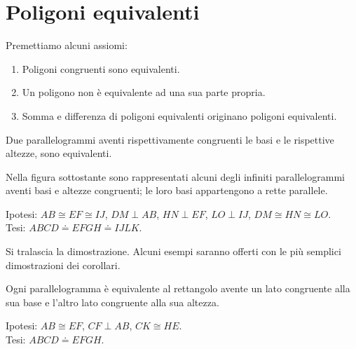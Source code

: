 \section{Poligoni equivalenti}\label{sect:poligoni_equivalenti}

Premettiamo alcuni assiomi:
\nopagebreak
\begin{enumerate}
\item Poligoni congruenti sono equivalenti.
\item Un poligono non è equivalente ad una sua parte propria.
\item Somma e differenza di poligoni equivalenti originano poligoni 
equivalenti.
\end{enumerate}

\begin{teorema}\label{teo:7.1}
Due parallelogrammi aventi rispettivamente congruenti le basi e le 
rispettive altezze, sono equivalenti.
\end{teorema}

Nella figura sottostante sono rappresentati alcuni degli infiniti 
parallelogrammi aventi basi e altezze congruenti; le loro basi 
appartengono a rette parallele.

\noindent Ipotesi: $AB\cong EF\cong IJ$, $DM\perp AB$, $HN\perp EF$, 
$LO\perp IJ$, $DM\cong HN\cong LO$.\\
Tesi: $ABCD\doteq EFGH\doteq IJLK$.\\

\begin{figure*}[!htb]
	
\centering
\end{figure*}

Si tralascia la dimostrazione. Alcuni esempi saranno offerti con le più semplici dimostrazioni dei corollari.
 
\begin{corollario}\label{cor:7.1}
Ogni parallelogramma è equivalente al rettangolo avente un lato 
congruente alla sua base e l'altro lato congruente alla sua altezza.
\end{corollario}

\noindent Ipotesi: $AB\cong EF$, $CF\perp AB$, $CK\cong HE$.\\
Tesi: $ABCD\doteq EFGH$.

\begin{figure*}[!htb]
	\centering
\end{figure*}

